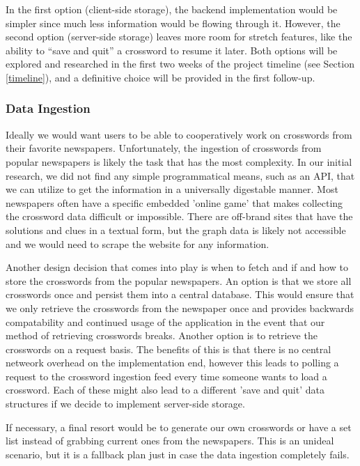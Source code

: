 \documentclass{article}
\begin{document}
In the first option (client-side storage), the backend implementation would be simpler since much less information
would be flowing through it. However, the second option (server-side storage) leaves more room
for stretch features, like the ability to ``save and quit'' a crossword to resume it later.
Both options will be explored and researched in the first two weeks of the project timeline (see Section \ref{timeline}), and a definitive choice will be provided in the first follow-up.

\subsubsection{Data Ingestion}
\label{ingestarch}
Ideally we would want users to be able to cooperatively work on crosswords from their favorite newspapers.
Unfortunately, the ingestion of crosswords from popular newspapers is likely the task that has the most complexity. In our initial
research, we did not find any simple programmatical means, such as an API, that we can utilize to get the information in
a universally digestable manner.  Most newspapers often have a specific embedded 'online game' that makes collecting
the crossword data difficult or impossible. There are off-brand sites that have the solutions and clues in a textual form,
but the graph data is likely not accessible and we would need to scrape the website for any information.

Another design decision that comes into play is when to fetch and if and how to store the crosswords from 
the popular newspapers. An option is that we store all crosswords once and persist them into a central database. This would
ensure that we only retrieve the crosswords from the newspaper once and provides backwards compatability and continued 
usage of the application in the event that our method of retrieving crosswords breaks. Another option is to retrieve the
crosswords on a request basis. The benefits of this is that there is no central netweork overhead on the implementation
end, however this leads to polling a request to the crossword ingestion feed every time someone wants to load a crossword.
Each of these might also lead to a different 'save and quit' data structures if we decide to implement server-side storage.

If necessary, a final resort would be to generate our own crosswords or have a set list 
instead of grabbing current ones from the newspapers. This is an unideal scenario, but it is a fallback plan just in
case the data ingestion completely fails.
\end{document}
